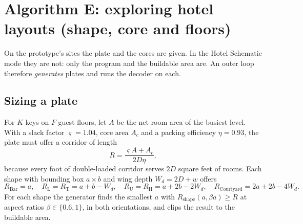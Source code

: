 \documentclass[10pt,a4paper]{article}
\begin{document}
\section{Algorithm E: exploring hotel layouts (shape, core and floors)}\label{sec:hotel}
On the prototype's sites the plate and the cores are given. In the Hotel Schematic mode they are not: only the program
and the buildable area are. An outer loop therefore \emph{generates} plates and runs the decoder on each.

\subsection{Sizing a plate}
For $K$ keys on $F$ guest floors, let $A$ be the net room area of the busiest level. With a slack factor
$\varsigma = 1.04$, core area $A_c$ and a packing efficiency $\eta = 0.93$, the plate must offer a corridor of length
\[ R = \frac{\varsigma A + A_c}{2 D \eta}, \]
because every foot of double-loaded corridor serves $2D$ square feet of rooms. Each shape with bounding box
$a \times b$ and wing depth $W_d = 2D + w$ offers
\[ R_{\text{Bar}} = a,\quad R_{\text{L}} = R_{\text{T}} = a + b - W_d,\quad R_{\text{U}} = R_{\text{H}} = a + 2b - 2W_d,\quad
R_{\text{Courtyard}} = 2a + 2b - 4W_d . \]
For each shape the generator finds the smallest $a$ with $R_{\text{shape}}(a, \beta a) \ge R$ at aspect ratios
$\beta \in \{0.6, 1\}$, in both orientations, and clips the result to the buildable area.
\end{document}
